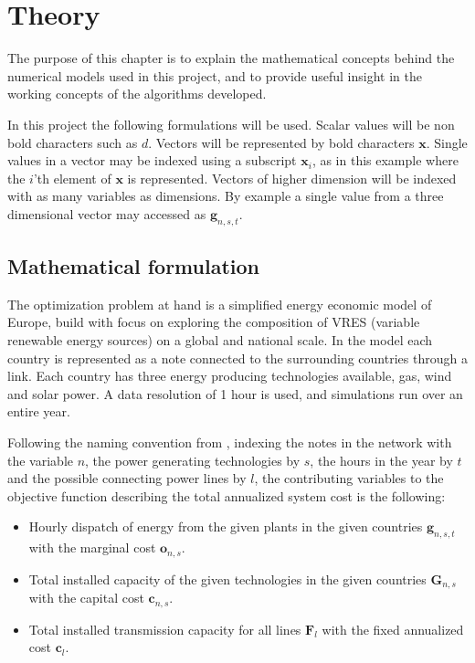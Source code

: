 
\chapter{Theory}
The purpose of this chapter is to explain the mathematical concepts behind the numerical models used in this project, and to provide useful insight in the working concepts of the algorithms developed. 

In this project the following formulations will be used. Scalar values will be non bold characters such as $d$. Vectors will be represented by bold characters $ \mathbf{x} $. Single values in a vector may be indexed using a subscript $ \mathbf{x}_i $, as in this example where the $i$'th element of $\mathbf{x}$ is represented. Vectors of higher dimension will be indexed with as many variables as dimensions. By example a single value from a three dimensional vector may accessed as $\mathbf{g}_{n,s,t}$. 



\section{Mathematical formulation}\label{sec:OptimizationProblem}


The optimization problem at hand is a simplified energy economic model of Europe, build with focus on exploring the composition of VRES (variable renewable energy sources) on a global and national scale. In the model each country is represented as a note connected to the surrounding countries through a link. Each country has three energy producing technologies available, gas, wind and solar power. A data resolution of 1 hour is used, and simulations run over an entire year. 

Following the naming convention from \cite{PyPSA_euro_30_model}, indexing the notes in the network with the variable $n$, the power generating technologies by $s$, the hours in the year by $t$ and the possible connecting power lines by $l$, the contributing variables to the objective function describing the total annualized system cost is the following: 

\begin{itemize}
	\item Hourly dispatch of energy from the given plants in the given countries $\mathbf{g}_{n,s,t}$ with the marginal cost $\mathbf{o}_{n,s}$.
	\item Total installed capacity of the given technologies in the given countries $\mathbf{G}_{n,s}$ with the capital cost $\mathbf{c}_{n,s}$.
	\item Total installed transmission capacity for all lines $\mathbf{F}_{l}$ with the fixed annualized cost $\mathbf{c}_{l}$.
	
\end{itemize}

